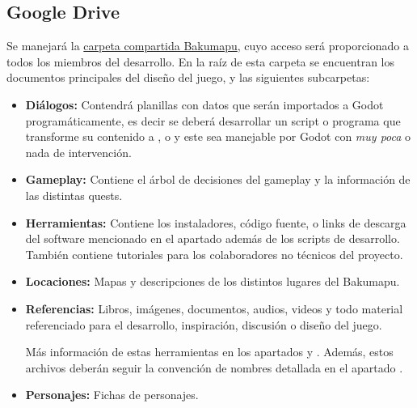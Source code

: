 
\subsection{Google Drive}\label{flujo:google-drive}
Se manejará la \href{https://drive.google.com/open?id=1p8u-1UpXts8OHGRHEZLSIiQrqqx0Y4Kt}{carpeta compartida Bakumapu}, cuyo acceso será proporcionado a todos los miembros del desarrollo. En la raíz de esta carpeta se encuentran los documentos principales del diseño del juego, y las siguientes subcarpetas:

\begin{itemize}

	\item \textbf{Diálogos:} Contendrá planillas con datos que serán importados a Godot programáticamente, es decir se deberá desarrollar un script o programa que transforme su contenido a ,  o  y este sea manejable por Godot con \emph{muy poca} o nada de intervención.

	\item \textbf{Gameplay:} Contiene el árbol de decisiones del gameplay y la información de las distintas quests.
	
	\item \textbf{Herramientas:} Contiene los instaladores, código fuente, o links de descarga del software mencionado en el apartado  además de los scripts de desarrollo. También contiene tutoriales para los colaboradores no técnicos del proyecto.
	
	\item \textbf{Locaciones:} Mapas y descripciones de los distintos lugares del Bakumapu.
	
	\item \textbf{Referencias:} Libros, imágenes, documentos, audios, videos y todo material referenciado para el desarrollo, inspiración, discusión o diseño del juego.

	Más información de estas herramientas en los apartados  y . Además, estos archivos deberán seguir la convención de nombres detallada en el apartado .
	
	\item \textbf{Personajes:} Fichas de personajes.
	
\end{itemize}


